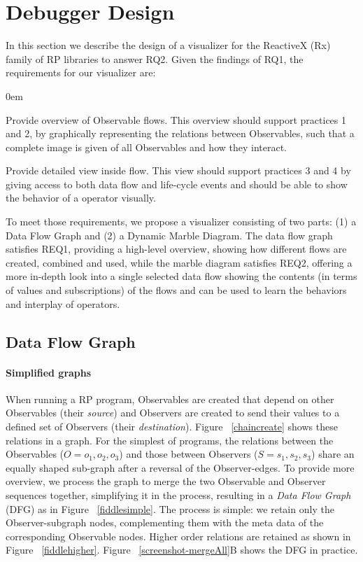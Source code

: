 \section{Debugger Design}%
\label{section-design} In this section we describe the design of a
visualizer for the ReactiveX (Rx) family of RP libraries to answer RQ2.
Given the findings of RQ1, the requirements for our visualizer are:
\begin{description}
        \itemsep0em
    \item[REQ1]
        Provide overview of Observable flows.  This overview should
        support practices 1 and 2, by graphically representing the
        relations between Observables, such that a complete image is
        given of all Observables and how they interact.
    \item[REQ2]
        Provide detailed view inside flow.  This view should support
        practices 3 and 4 by giving access to both data flow and
        life-cycle events and should be able to show the behavior of a
        operator visually.
\end{description}

To meet those requirements, we propose a visualizer consisting of two
parts:  (1) a Data Flow Graph and (2) a Dynamic Marble Diagram.  The
data flow graph satisfies REQ1, providing a high-level overview, showing
how different flows are created, combined and used, while the marble
diagram satisfies REQ2, offering a more in-depth look into a single
selected data flow showing the contents (in terms of values and
subscriptions) of the flows and can be used to learn the behaviors and
interplay of operators.

\subsection{Data Flow Graph}
\paragraph{Simplified graphs} When running a RP program, Observables
are created that depend on other Observables (their \emph{source}) and
Observers are created to send their values to a defined set of Observers
(their \emph{destination}).  Figure~%
\ref{chaincreate} shows these relations in a graph.  For the simplest of
programs, the relations between the Observables ($ O = {o_1, o_2, o_3} $)
and those between Observers ($ S = {s_1, s_2, s_3} $) share an equally
shaped sub-graph after a reversal of the Observer-edges.  To provide
more overview, we process the graph to merge the two Observable and
Observer sequences together, simplifying it in the process, resulting in
a \emph{Data Flow Graph} (DFG) as in Figure~%
\ref{fiddlesimple}.  The process is simple:  we retain only the
Observer-subgraph nodes, complementing them with the meta data of the
corresponding Observable nodes.  Higher order relations are retained as
shown in Figure~%
\ref{fiddlehigher}.  Figure~%
\ref{screenshot-mergeAll}B shows the DFG in practice.

